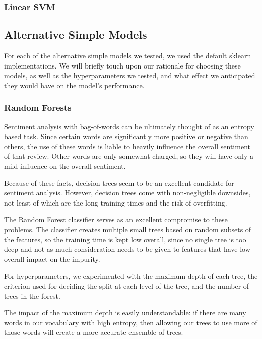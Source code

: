 \documentclass[conference]{IEEEtran}
\begin{document}

\subsubsection{Linear SVM}


\subsection{Alternative Simple Models}

For each of the alternative simple models we tested, we used the default sklearn implementations. We will briefly touch upon our rationale for choosing these models, as well as the hyperparameters we tested, and what effect we anticipated they would have on the model's performance.

\subsubsection{Random Forests}

Sentiment analysis with bag-of-words can be ultimately thought of as an entropy based task. Since certain words are significantly more positive or negative than others, the use of these words is liable to heavily influence the overall sentiment of that review. Other words are only somewhat charged, so they will have only a mild influence on the overall sentiment.

Because of these facts, decision trees seem to be an excellent candidate for sentiment analysis. However, decision trees come with non-negligible downsides, not least of which are the long training times and the risk of overfitting.

The Random Forest classifier serves as an excellent compromise to these problems. The classifier creates multiple small trees based on random subsets of the features, so the training time is kept low overall, since no single tree is too deep and not as much consideration needs to be given to features that have low overall impact on the impurity.

For hyperparameters, we experimented with the maximum depth of each tree, the criterion used for deciding the split at each level of the tree, and the number of trees in the forest.

The impact of the maximum depth is easily understandable: if there are many words in our vocabulary with high entropy, then allowing our trees to use more of those words will create a more accurate ensemble of trees.
\end{document}
